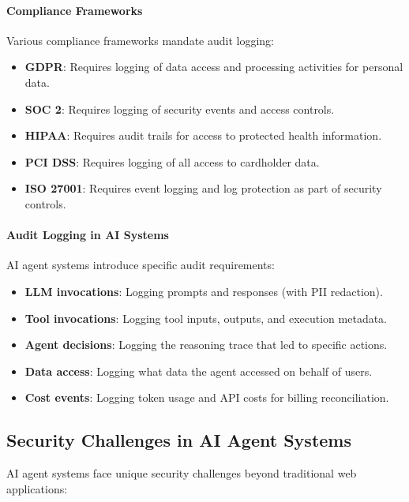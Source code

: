 \documentclass[a4paper,twoside]{sapthesis}
\begin{document}
\paragraph{Compliance Frameworks}

Various compliance frameworks mandate audit logging:

\begin{itemize}
    \item \textbf{GDPR}: Requires logging of data access and processing activities for personal data.
    \item \textbf{SOC 2}: Requires logging of security events and access controls.
    \item \textbf{HIPAA}: Requires audit trails for access to protected health information.
    \item \textbf{PCI DSS}: Requires logging of all access to cardholder data.
    \item \textbf{ISO 27001}: Requires event logging and log protection as part of security controls.
\end{itemize}

\paragraph{Audit Logging in AI Systems}

AI agent systems introduce specific audit requirements:

\begin{itemize}
    \item \textbf{LLM invocations}: Logging prompts and responses (with PII redaction).
    \item \textbf{Tool invocations}: Logging tool inputs, outputs, and execution metadata.
    \item \textbf{Agent decisions}: Logging the reasoning trace that led to specific actions.
    \item \textbf{Data access}: Logging what data the agent accessed on behalf of users.
    \item \textbf{Cost events}: Logging token usage and API costs for billing reconciliation.
\end{itemize}

\subsection{Security Challenges in AI Agent Systems}

AI agent systems face unique security challenges beyond traditional web applications:
\end{document}
